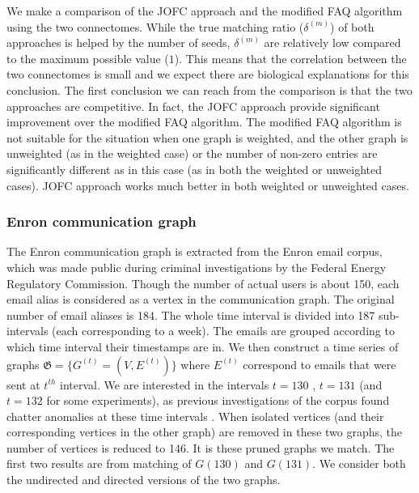 \documentclass[12pt,oneside,final]{thesis}\usepackage[]{graphicx}\usepackage[]{color}
\begin{document}
We make  a comparison of the JOFC approach and the modified FAQ algorithm using the two connectomes. While the true matching ratio ($\delta^{(m)}$) of both approaches is helped by the number of seeds,  $\delta^{(m)}$ are relatively low compared to the maximum possible value ($1$). This means that the correlation between the two connectomes is small and we expect there are biological explanations for this conclusion.  
The first conclusion we can reach from the comparison is that the two approaches are competitive. In fact, the JOFC approach provide significant improvement over the modified FAQ algorithm. The modified FAQ algorithm is not suitable for the situation when one graph is weighted, and the other graph is unweighted (as in the weighted case) or the number of non-zero entries are significantly different as in this case (as in both the weighted or unweighted cases). JOFC approach works much better in both weighted or unweighted cases. 

\subsubsection{Enron communication graph}
The Enron communication graph is extracted from the  Enron  email corpus, which was made public during criminal investigations by the  Federal Energy Regulatory Commission. Though the number of actual users is about 150,  each email alias is considered as a vertex in the communication graph. The original number of email aliases is 184. The whole time interval is divided into 187 sub-intervals (each corresponding to a week). The emails are grouped according to which time interval their timestamps are in. We then construct a time series of graphs $\mathfrak{G}=\{G^{(t)} = (V,E^{(t)})\}$ where $E^{(t)}$ correspond to emails that were sent at $t^{th}$ interval. We are interested in the intervals $t=130$ , $t=131$ (and $t=132$ for some experiments), as previous  investigations of the corpus found chatter anomalies at these time intervals \cite{EnronStudy}. When isolated vertices (and their corresponding vertices in the other graph) are removed in these two graphs, the number of vertices is reduced to 146. It is these pruned graphs we match. The first two results are from matching of $G(130)$ and $G(131)$. We consider both the undirected and directed versions of the two graphs.
\end{document}
